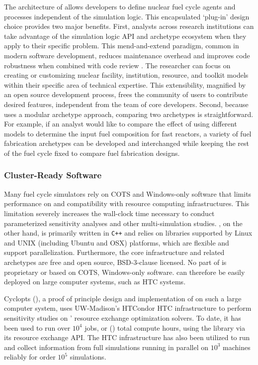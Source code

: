 The architecture of \Cyclus allows developers 
to define nuclear fuel cycle agents and processes independent of the simulation 
logic. This encapsulated `plug-in'
design choice provides two major benefits. First, analysts across research institutions can take advantage of the 
simulation logic \gls{API} and archetype ecosystem when they apply \Cyclus to 
their specific problem. This 
mend-and-extend paradigm, common in modern software development, reduces 
maintenance overhead and improves code robustness when combined with code 
review \cite{cohen_modern_2010}. 
The researcher can focus on creating or customizing nuclear 
facility, institution, resource, and toolkit models within their specific area 
of technical expertise. This extensibility, magnified by an open source 
development process, frees the community of users to contribute desired 
features, independent from the team of \Cyclus core developers. 
Second, because \Cyclus uses a modular archetype approach, comparing two 
archetypes is straightforward. For example, if an analyst would like 
to compare the effect of using different models to determine the input fuel 
composition for fast reactors, a variety of fuel fabrication archetypes can be 
developed and interchanged while keeping the rest of the fuel cycle fixed
 to compare fuel fabrication designs.

\subsubsection{Cluster-Ready Software}

Many fuel cycle simulators rely on \gls{COTS} and Windows-only software that limits 
performance on and compatibility with resource computing infrastructures. This limitation severely 
increases the wall-clock time necessary to conduct parameterized sensitivity 
analyses and other multi-simulation studies. \Cyclus, on the other hand, is 
primarily written in \texttt{C++} and relies on 
libraries supported by Linux and UNIX (including Ubuntu and OSX) platforms, 
which are flexible and support parallelization. 
Furthermore, the core infrastructure and related archetypes are free and 
open source, BSD-3-clause licensed. No part of \Cyclus is proprietary or based 
on \gls{COTS}, Windows-only software. \Cyclus can therefore be easily deployed 
on large computer systems, such as \gls{HTC} systems.

Cyclopts (), a proof of principle design and implementation of \Cyclus on such a large computer system,
 uses UW-Madison's HTCondor \gls{HTC} infrastructure to perform sensitivity
studies on \Cyclus' resource exchange optimization solvers. To date, it has been
used to run over $10^4$ jobs, or () total compute hours, using
the \Cyclus library via its resource exchange \gls{API}.
The \gls{HTC} infrastructure has also been utilized to run and collect
information from full \Cyclus simulations running in parallel on $10^3$
machines reliably for order $10^5$ simulations.

